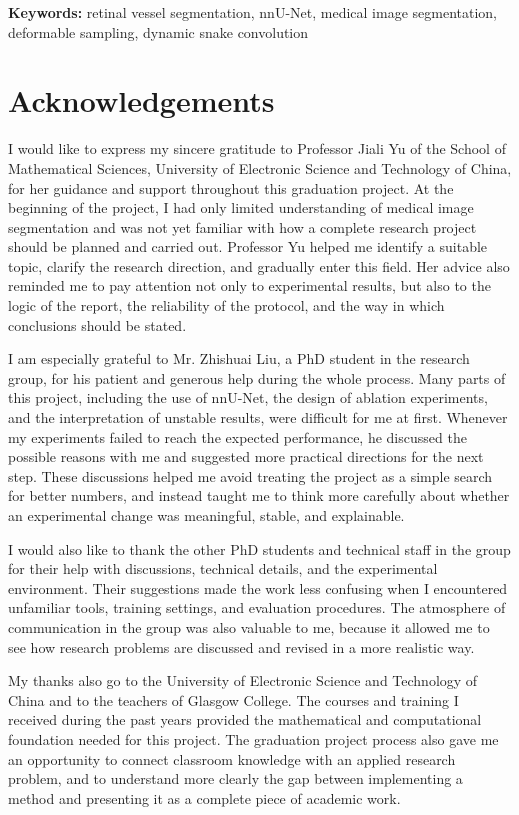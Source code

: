 \documentclass[a4paper,11pt]{article}
\begin{document}
\noindent\textbf{Keywords:} retinal vessel segmentation, nnU-Net, medical image segmentation, deformable sampling, dynamic snake convolution

\clearpage

\section*{Acknowledgements}
I would like to express my sincere gratitude to Professor Jiali Yu of the School of Mathematical Sciences, University of Electronic Science and Technology of China, for her guidance and support throughout this graduation project. At the beginning of the project, I had only limited understanding of medical image segmentation and was not yet familiar with how a complete research project should be planned and carried out. Professor Yu helped me identify a suitable topic, clarify the research direction, and gradually enter this field. Her advice also reminded me to pay attention not only to experimental results, but also to the logic of the report, the reliability of the protocol, and the way in which conclusions should be stated.

I am especially grateful to Mr. Zhishuai Liu, a PhD student in the research group, for his patient and generous help during the whole process. Many parts of this project, including the use of nnU-Net, the design of ablation experiments, and the interpretation of unstable results, were difficult for me at first. Whenever my experiments failed to reach the expected performance, he discussed the possible reasons with me and suggested more practical directions for the next step. These discussions helped me avoid treating the project as a simple search for better numbers, and instead taught me to think more carefully about whether an experimental change was meaningful, stable, and explainable.

I would also like to thank the other PhD students and technical staff in the group for their help with discussions, technical details, and the experimental environment. Their suggestions made the work less confusing when I encountered unfamiliar tools, training settings, and evaluation procedures. The atmosphere of communication in the group was also valuable to me, because it allowed me to see how research problems are discussed and revised in a more realistic way.

My thanks also go to the University of Electronic Science and Technology of China and to the teachers of Glasgow College. The courses and training I received during the past years provided the mathematical and computational foundation needed for this project. The graduation project process also gave me an opportunity to connect classroom knowledge with an applied research problem, and to understand more clearly the gap between implementing a method and presenting it as a complete piece of academic work.
\end{document}
